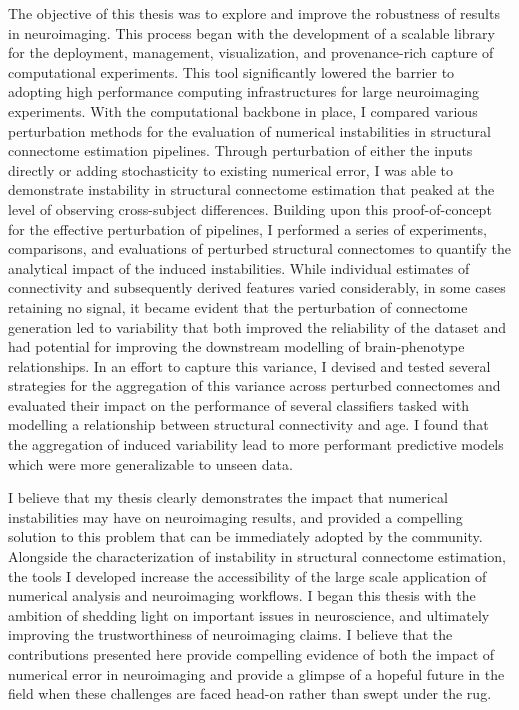 The objective of this thesis was to explore and improve the robustness of results in neuroimaging. This process
began with the development of a scalable library for the deployment, management, visualization, and
provenance-rich capture of computational experiments. This tool significantly lowered the barrier to adopting high
performance computing infrastructures for large neuroimaging experiments. With the computational backbone in place,
I compared various perturbation methods for the evaluation of numerical instabilities in structural connectome
estimation pipelines. Through perturbation of either the inputs directly or adding stochasticity to existing
numerical error, I was able to demonstrate instability in structural connectome estimation that peaked at the level
of observing cross-subject differences. Building upon this proof-of-concept for the effective perturbation of
pipelines, I performed a series of experiments, comparisons, and evaluations of perturbed structural connectomes to
quantify the analytical impact of the induced instabilities. While individual estimates of connectivity and
subsequently derived features varied considerably, in some cases retaining no signal, it became evident that the
perturbation of connectome generation led to variability that both improved the reliability of the dataset and had
potential for improving the downstream modelling of brain-phenotype relationships. In an effort to capture this
variance, I devised and tested several strategies for the aggregation of this variance across perturbed connectomes
and evaluated their impact on the performance of several classifiers tasked with modelling a relationship between
structural connectivity and age. I found that the aggregation of induced variability lead to more performant
predictive models which were more generalizable to unseen data.

I believe that my thesis clearly demonstrates the impact that numerical instabilities may have on neuroimaging
results, and provided a compelling solution to this problem that can be immediately adopted by the community.
Alongside the characterization of instability in structural connectome estimation, the tools I developed increase the
accessibility of the large scale application of numerical analysis and neuroimaging workflows. I began this thesis
with the ambition of shedding light on important issues in neuroscience, and ultimately improving the trustworthiness
of neuroimaging claims. I believe that the contributions presented here provide compelling evidence of both the
impact of numerical error in neuroimaging and provide a glimpse of a hopeful future in the field when these
challenges are faced head-on rather than swept under the rug.

